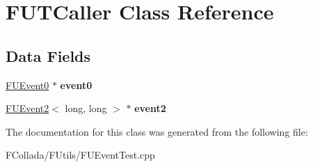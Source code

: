 \hypertarget{classFUTCaller}{
\section{FUTCaller Class Reference}
\label{classFUTCaller}
}
\subsection*{Data Fields}
\begin{DoxyCompactItemize}
\item 
\hypertarget{classFUTCaller_a70a7a1f4801ac0484b83a6fec5b9a496}{
\hyperlink{classFUEvent0}{FUEvent0} $\ast$ {\bfseries event0}}
\label{classFUTCaller_a70a7a1f4801ac0484b83a6fec5b9a496}

\item 
\hypertarget{classFUTCaller_a2ac0acda1d660ebaa37db09b656d1690}{
\hyperlink{classFUEvent2}{FUEvent2}$<$ long, long $>$ $\ast$ {\bfseries event2}}
\label{classFUTCaller_a2ac0acda1d660ebaa37db09b656d1690}

\end{DoxyCompactItemize}


The documentation for this class was generated from the following file:\begin{DoxyCompactItemize}
\item 
FCollada/FUtils/FUEventTest.cpp\end{DoxyCompactItemize}

